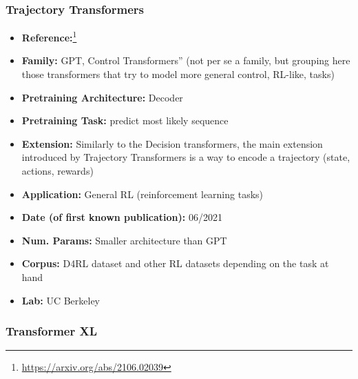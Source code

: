\documentclass{article}
\begin{document}
\subsubsection{Trajectory Transformers}

            \begin{itemize}
                \item \textbf{Reference:}\footnote{\url{https://arxiv.org/abs/2106.02039}}\cite{janner2021offline}
                \item \textbf{Family:} GPT, Control Transformers” (not per se a family, but grouping here those transformers that try to model more general control, RL-like, tasks) 
                \item \textbf{Pretraining Architecture:} Decoder
                \item \textbf{Pretraining Task:} predict most likely sequence
                \item \textbf{Extension:} Similarly to the Decision transformers, the main extension introduced by Trajectory Transformers is a way to encode a trajectory (state, actions, rewards)  
                \item \textbf{Application:} General RL (reinforcement learning tasks)
                \item \textbf{Date (of first known publication):} 06/2021
                \item \textbf{Num. Params:} Smaller architecture than GPT
                \item \textbf{Corpus:} D4RL dataset and other RL datasets depending on the task at hand
                \item \textbf{Lab:} UC Berkeley
            \end{itemize}

\subsubsection{Transformer XL}
\end{document}
